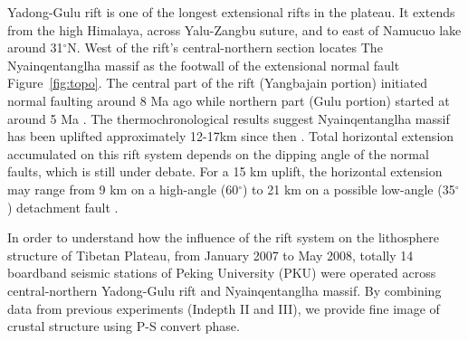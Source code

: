 
Yadong-Gulu rift is one of the longest extensional rifts in the plateau. It extends from the high Himalaya, across Yalu-Zangbu suture, and to east of Namucuo lake around 31$^\circ$N. West of the rift's central-northern section locates The Nyainqentanglha massif as the footwall of the extensional normal fault Figure~\ref{fig:topo}. 
The central part of the rift (Yangbajain portion) initiated normal faulting around 8 Ma ago while northern part (Gulu portion) started at around 5 Ma \cite{Harrison_1995,stockli2002late}. The thermochronological results suggest Nyainqentanglha massif has been uplifted approximately 12-17km since then \cite{Harrison_1995,Kapp_2005}. Total horizontal extension accumulated on this rift system depends on the dipping angle of the normal faults, which is still under debate. For a 15 km uplift, the horizontal extension may range from 9 km on a high-angle (60$^\circ$) to 21 km on a possible low-angle (35$^\circ$) detachment fault \cite{Cogan_1998}. 

In order to understand how the influence of the rift system on the lithosphere structure of Tibetan Plateau, from January 2007 to May 2008, totally 14 boardband seismic stations of Peking University (PKU) were operated across central-northern Yadong-Gulu rift and Nyainqentanglha massif. By combining data from previous experiments (Indepth II and III), we provide fine image of crustal structure using P-S convert phase.